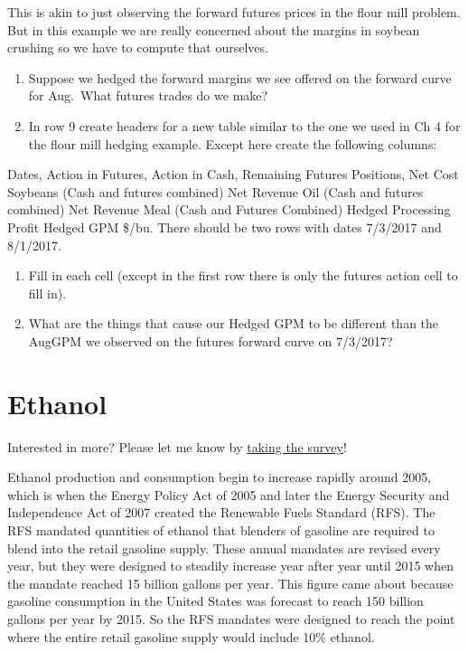 \documentclass[
  letterpaper,
  DIV=11,
  numbers=noendperiod]{scrreprt}
\begin{document}
This is akin to just observing the forward futures prices in the flour
mill problem. But in this example we are really concerned about the
margins in soybean crushing so we have to compute that ourselves.

\begin{enumerate}
\def\labelenumi{\arabic{enumi}.}
\setcounter{enumi}{1}
\item
  Suppose we hedged the forward margins we see offered on the forward
  curve for Aug.~What futures trades do we make?
\item
  In row 9 create headers for a new table similar to the one we used in
  Ch 4 for the flour mill hedging example. Except here create the
  following columns:
\end{enumerate}

Dates, Action in Futures, Action in Cash, Remaining Futures Positions,
Net Cost Soybeans (Cash and futures combined) Net Revenue Oil (Cash and
futures combined) Net Revenue Meal (Cash and Futures Combined) Hedged
Processing Profit Hedged GPM \$/bu. There should be two rows with dates
7/3/2017 and 8/1/2017.

\begin{enumerate}
\def\labelenumi{\arabic{enumi}.}
\setcounter{enumi}{3}
\item
  Fill in each cell (except in the first row there is only the futures
  action cell to fill in).
\item
  What are the things that cause our Hedged GPM to be different than the
  AugGPM we observed on the futures forward curve on 7/3/2017?
\end{enumerate}


\hypertarget{ethanol}{%
\chapter{Ethanol}\label{ethanol}}

{Interested in more? Please let me know by}
\href{https://forms.gle/Q3VByCQZHjfQSy9D7}{taking the survey}!

Ethanol production and consumption begin to increase rapidly around
2005, which is when the Energy Policy Act of 2005 and later the Energy
Security and Independence Act of 2007 created the Renewable Fuels
Standard (RFS). The RFS mandated quantities of ethanol that blenders of
gasoline are required to blend into the retail gasoline supply. These
annual mandates are revised every year, but they were designed to
steadily increase year after year until 2015 when the mandate reached 15
billion gallons per year. This figure came about because gasoline
consumption in the United States was forecast to reach 150 billion
gallons per year by 2015. So the RFS mandates were designed to reach the
point where the entire retail gasoline supply would include 10\%
ethanol.
\end{document}
